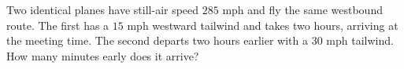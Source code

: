 Two identical planes have still-air speed $ 285 $ mph and fly the same westbound route. The first has a $ 15 $ mph westward tailwind and takes two hours, arriving at the meeting time. The second departs two hours earlier with a $ 30 $ mph tailwind. How many minutes early does it arrive?
